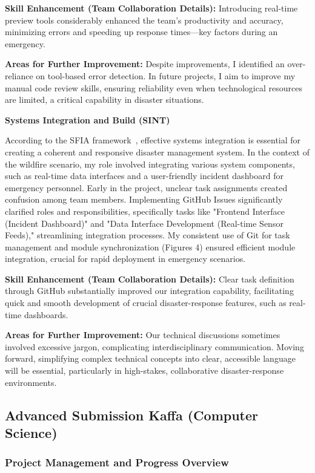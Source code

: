\documentclass[a4paper, 11pt]{report}
\begin{document}
\textbf{Skill Enhancement (Team Collaboration Details):}  
Introducing real-time preview tools considerably enhanced the team's productivity and accuracy, minimizing errors and speeding up response times—key factors during an emergency.

\textbf{Areas for Further Improvement:}  
Despite improvements, I identified an over-reliance on tool-based error detection. In future projects, I aim to improve my manual code review skills, ensuring reliability even when technological resources are limited, a critical capability in disaster situations.

\textbf{Systems Integration and Build (SINT)}

According to the SFIA framework~\cite{sfia}, effective systems integration is essential for creating a coherent and responsive disaster management system. In the context of the wildfire scenario, my role involved integrating various system components, such as real-time data interfaces and a user-friendly incident dashboard for emergency personnel. Early in the project, unclear task assignments created confusion among team members. Implementing GitHub Issues significantly clarified roles and responsibilities, specifically tasks like "Frontend Interface (Incident Dashboard)" and "Data Interface Development (Real-time Sensor Feeds)," streamlining integration processes. My consistent use of Git for task management and module synchronization (Figures 4) ensured efficient module integration, crucial for rapid deployment in emergency scenarios.

\textbf{Skill Enhancement (Team Collaboration Details):}  
Clear task definition through GitHub substantially improved our integration capability, facilitating quick and smooth development of crucial disaster-response features, such as real-time dashboards.

\textbf{Areas for Further Improvement:}  
Our technical discussions sometimes involved excessive jargon, complicating interdisciplinary communication. Moving forward, simplifying complex technical concepts into clear, accessible language will be essential, particularly in high-stakes, collaborative disaster-response environments.

\subsection{Advanced Submission Kaffa (Computer Science)}

\subsubsection{Project Management and Progress Overview}
\end{document}
